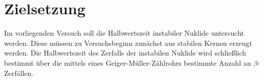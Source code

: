 \section{Zielsetzung}
\label{sec:Zielsetzung}
Im vorliegenden Versuch soll die Halbwertszeit instabiler Nuklide untersucht werden.
Diese müssen zu Versuchsbeginn zunächst aus stabilen Kernen erzeugt werden. Die Halbwertszeit des Zerfalls der instabilen Nuklide wird schließlich bestimmt über die mittels eines Geiger-Müller-Zählrohrs bestimmte  Anzahl an $\beta$-Zerfällen.
